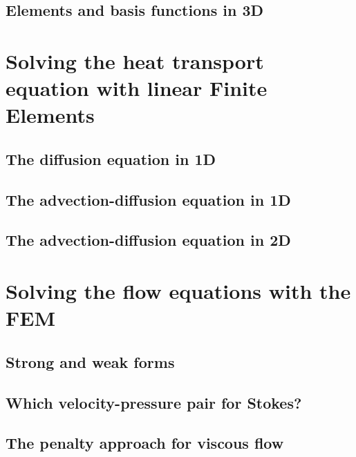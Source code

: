 \documentclass[a4paper]{article}
\begin{document}
\subsection{Elements and basis functions in 3D}  %

\newpage 
\section{Solving the heat transport equation with linear Finite Elements} %
\subsection{The diffusion equation in 1D} \label{sec:diff1D}  %
\subsection{The advection-diffusion equation in 1D} \label{sec:advec-diff1D} %
\subsection{The advection-diffusion equation in 2D}  %

\newpage 
\section{Solving the flow equations with the FEM} \label{solvingFEM} %
\subsection{Strong and weak forms}  %
\subsection{Which velocity-pressure pair for Stokes?}  %
\subsection{The penalty approach for viscous flow}\label{sec:penalty} %
\end{document}
